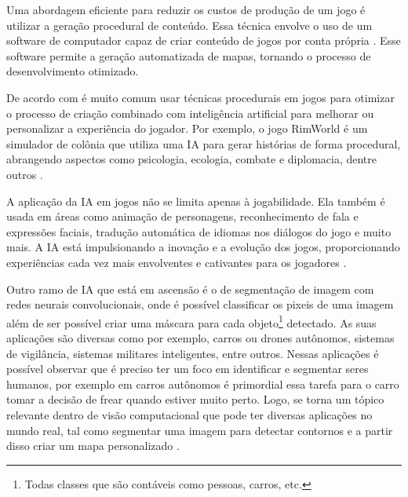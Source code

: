 Uma abordagem eficiente para reduzir os custos de produção de um jogo é utilizar a geração procedural de conteúdo. Essa técnica envolve o uso de um software de computador capaz de criar conteúdo de jogos por conta própria \cite{procedural_centent_book}. Esse software permite a geração automatizada de mapas, tornando o processo de desenvolvimento otimizado.


De acordo com  é muito comum usar técnicas procedurais em jogos para otimizar o processo de criação combinado com inteligência artificial para melhorar ou personalizar a experiência do jogador. Por exemplo, o jogo RimWorld é um simulador de colônia que utiliza uma IA para gerar histórias de forma procedural, abrangendo aspectos como psicologia, ecologia, combate e diplomacia, dentre outros \cite{jogo_procedural}.

A aplicação da IA em jogos não se limita apenas à jogabilidade. Ela também é usada em áreas como animação de personagens, reconhecimento de fala e expressões faciais, tradução automática de idiomas nos diálogos do jogo e muito mais. A IA está impulsionando a inovação e a evolução dos jogos, proporcionando experiências cada vez mais envolventes e cativantes para os jogadores \cite{exameNvidia, omniverseace}.

Outro ramo de IA que está em ascensão é o de segmentação de imagem com redes neurais convolucionais, onde é possível classificar os pixeis de uma imagem além de ser possível criar uma máscara  para cada objeto\footnote{Todas classes que são contáveis como pessoas, carros, etc.} detectado. As suas aplicações são diversas como por exemplo, carros ou drones autônomos, sistemas de vigilância, sistemas militares inteligentes, entre outros. Nessas aplicações é possível observar que é preciso ter um foco em identificar e segmentar seres humanos, por exemplo em carros autônomos é primordial essa tarefa para o carro tomar a decisão de frear quando estiver muito perto. Logo, se torna um tópico relevante dentro de visão computacional que pode ter diversas aplicações no mundo real, tal como segmentar uma imagem para detectar contornos e a partir disso criar um mapa personalizado \cite{kirillov2019panoptic, dp_semantic_segmantation}.

